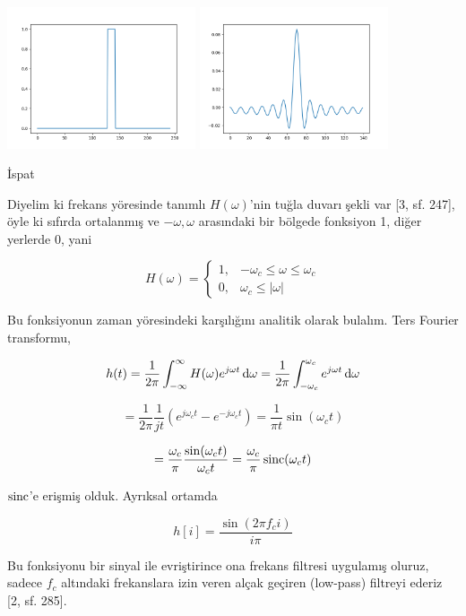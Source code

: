 \documentclass[12pt,fleqn]{article}\usepackage{../../common}
\begin{document}
\includegraphics[width=15em]{compscieng_1_24_02.png}
\includegraphics[width=15em]{compscieng_1_24_01.png}

İspat

Diyelim ki frekans yöresinde tanımlı $H(\omega)$'nin tuğla duvarı şekli var
[3, sf. 247], öyle ki sıfırda ortalanmış ve $-\omega,\omega$ arasındaki bir
bölgede fonksiyon 1, diğer yerlerde 0, yani

$$ H(\omega) = 
\left\{ \begin{array}{ll}
1, & -\omega_c \le \omega \le \omega_c \\
0, & \omega_c \le |\omega|
\end{array} \right.
$$

Bu fonksiyonun zaman yöresindeki karşılığını analitik olarak bulalım. Ters
Fourier transformu,

$$ 
h(t) = \frac{1}{2\pi}  \int_{-\infty}^{\infty} 
H(\omega) e ^{j\omega t} \,\mathrm{d} \omega = 
\frac{1}{2\pi} \int_{-\omega_c}^{\omega_c} e ^{j\omega t} \,\mathrm{d} \omega
$$

$$ 
= \frac{1}{2\pi} \frac{1}{jt} (e ^{j\omega_c t} - e ^{-j\omega_c t}) =
\frac{1}{\pi t} \sin(\omega_c t)
$$

$$ 
= \frac{\omega_c}{\pi} \frac{\sin(\omega_c t)}{\omega_c t} 
= \frac{\omega_c}{\pi} \operatorname{sinc}(\omega_c t)
$$

$\operatorname{sinc}$'e erişmiş olduk. Ayrıksal ortamda 

$$ h[i] = \frac{\sin(2\pi f_c i)}{i \pi}$$

Bu fonksiyonu bir sinyal ile evriştirince ona frekans filtresi uygulamış
oluruz, sadece $f_c$ altındaki frekanslara izin veren alçak geçiren
(low-pass) filtreyi ederiz [2, sf. 285].
\end{document}
